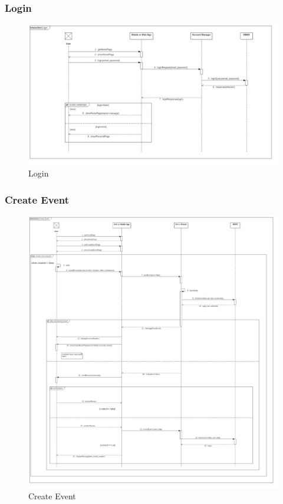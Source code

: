 \documentclass{article}
\begin{document}
				\subsubsection{Login}
				\begin{figure}[H]
				\includegraphics[width=\linewidth]{Images/Sequence_Diagrams/2-Login_DD.jpg}
				\caption{Login}
				\label{fig:SD2}
				\end{figure}
				\subsubsection{Create Event}
				\begin{figure}[H]
				\includegraphics[width=\linewidth]{Images/Sequence_Diagrams/3-Create_Event_DD.jpg}
				\caption{Create Event}
				\label{fig:SD3}
				\end{figure}
\end{document}
